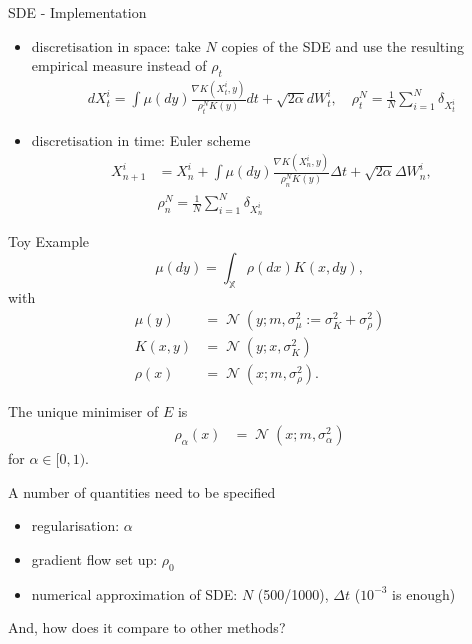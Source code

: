 \documentclass[aspectratio=149]{beamer}
\newcommand{\X}{\ensuremath{\mathbb{X}}}
\DeclareMathOperator{\N}{\mathcal{N}}
\begin{document}
\begin{frame}{SDE - Implementation}
\begin{itemize}
\item discretisation in space: take $N$ copies of the SDE and use the resulting empirical measure instead of $\rho_t$
\begin{align*}
dX_{t}^{i}=\int\mu\left(dy\right)\frac{\nabla K(X_{t}^{i},y)}{\rho_{t}^{N}K(y)}dt+\sqrt{2\alpha}dW_{t}^{i},\quad\rho_{t}^{N}=\frac{1}{N}\sum_{i=1}^{N}\delta_{X_{t}^{i}}
\end{align*}
\item discretisation in time: Euler scheme
\begin{align*}
X_{n+1}^{i}& =X_{n}^{i}+\int\mu\left(dy\right)\frac{\nabla K(X_{n}^{i},y)}{\rho_{n}^{N}K(y)}\Delta t+\sqrt{2\alpha}\Delta W^{i}_n,\\
&\rho_{n}^{N}=\frac{1}{N}\sum_{i=1}^{N}\delta_{X_{n}^{i}}
\end{align*}
\end{itemize}
\end{frame}

\begin{frame}{Toy Example}
\begin{equation*}
\mu(dy) = \int_{\X} \rho(dx) K(x, dy), 
\end{equation*}
with 
\begin{align*}
\mu(y)&=\N(y;m,\sigma_{\mu}^{2}:=\sigma_{K}^{2}+\sigma_{\rho}^{2})\\
K(x,y)&=\N(y;x,\sigma_{K}^{2})\\
\rho(x)&=\N(x;m,\sigma_{\rho}^{2}).
\end{align*}

The unique minimiser of $E$ is
\begin{align*}
\rho_\alpha(x)&=\N(x;m,\sigma_{\alpha}^{2})
\end{align*}
for $\alpha\in[0, 1)$.
\end{frame}
\begin{frame}
A number of quantities need to be specified
\begin{itemize}
\item regularisation: $\alpha$
\item gradient flow set up: $\rho_0$
\item numerical approximation of SDE: $N$ (500/1000), $\Delta t$ ($10^{-3}$ is enough)
\end{itemize}

And, how does it compare to other methods?
\end{frame}
\end{document}
